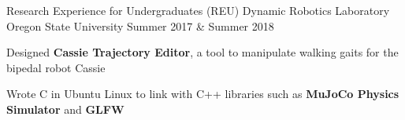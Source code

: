 \begin{cventries}
  


  \cventry
    {Research Experience for Undergraduates (REU)} %
    {Dynamic Robotics Laboratory} %
    {Oregon State University} %
    {Summer 2017 \& Summer 2018} %
    {
      \begin{cvitems} %
        \item {Designed \textbf{Cassie Trajectory Editor}, a tool to manipulate walking gaits for the bipedal robot Cassie}
        \item {Wrote C in Ubuntu Linux to link with C++ libraries such as \textbf{MuJoCo Physics Simulator} and \textbf{GLFW}}
      \end{cvitems}
    }
  







\end{cventries}
